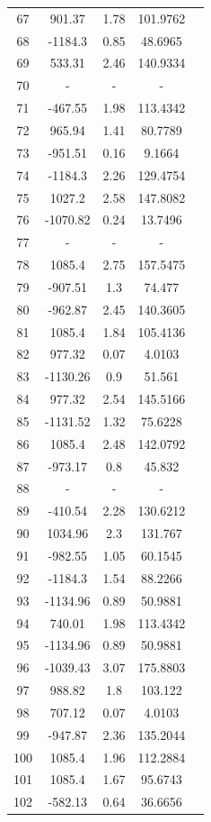 {\begin{longtable}{ccccc}
67 & 901.37 & 1.78 & 101.9762 \\ 
68 & -1184.3 & 0.85 & 48.6965 \\ 
69 & 533.31 & 2.46 & 140.9334 \\ 
70 & - & - & -   \\ 
71 & -467.55 & 1.98 & 113.4342 \\ 
72 & 965.94 & 1.41 & 80.7789 \\ 
73 & -951.51 & 0.16 & 9.1664 \\ 
74 & -1184.3 & 2.26 & 129.4754 \\ 
75 & 1027.2 & 2.58 & 147.8082 \\ 
76 & -1070.82 & 0.24 & 13.7496 \\ 
77 & - & - & -   \\ 
78 & 1085.4 & 2.75 & 157.5475 \\ 
79 & -907.51 & 1.3 & 74.477 \\ 
80 & -962.87 & 2.45 & 140.3605 \\ 
81 & 1085.4 & 1.84 & 105.4136 \\ 
82 & 977.32 & 0.07 & 4.0103 \\ 
83 & -1130.26 & 0.9 & 51.561 \\ 
84 & 977.32 & 2.54 & 145.5166 \\ 
85 & -1131.52 & 1.32 & 75.6228 \\ 
86 & 1085.4 & 2.48 & 142.0792 \\ 
87 & -973.17 & 0.8 & 45.832 \\ 
88 & - & - & -   \\ 
89 & -410.54 & 2.28 & 130.6212 \\ 
90 & 1034.96 & 2.3 & 131.767 \\ 
91 & -982.55 & 1.05 & 60.1545 \\ 
92 & -1184.3 & 1.54 & 88.2266 \\ 
93 & -1134.96 & 0.89 & 50.9881 \\ 
94 & 740.01 & 1.98 & 113.4342 \\ 
95 & -1134.96 & 0.89 & 50.9881 \\ 
96 & -1039.43 & 3.07 & 175.8803 \\ 
97 & 988.82 & 1.8 & 103.122 \\ 
98 & 707.12 & 0.07 & 4.0103 \\ 
99 & -947.87 & 2.36 & 135.2044 \\ 
100 & 1085.4 & 1.96 & 112.2884 \\ 
101 & 1085.4 & 1.67 & 95.6743 \\ 
102 & -582.13 & 0.64 & 36.6656 \\ 

\end{longtable}}

